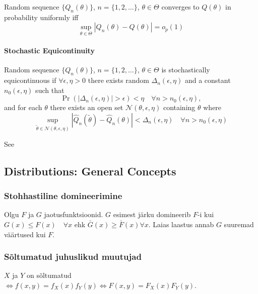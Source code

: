 \documentclass[a4paper]{article}
\numberwithin{equation}{subsection}
\begin{document}
Random sequence $\{Q_{n}(\theta)\}$, $n = \{1,2,\dots\}$, $\theta\in\Theta$ converges to
$Q(\theta)$ in probability uniformly iff
\begin{equation}
  \label{eq:uniform_convergence_in_probability}
  \sup_{\theta\in\Theta}
  \left| Q_{n}(\theta) - Q(\theta) \right| = o_{p}(1)
\end{equation}

\paragraph{Stochastic Equicontinuity}

Random sequence $\{Q_{n}(\theta)\}$, $n = \{1,2,\dots\}$,
$\theta\in\Theta$ is stochastically equicontinuous if $\forall
\epsilon, \eta > 0$ there exists random $\Delta_{n}(\epsilon, \eta)$
and a constant $n_{0}(\epsilon,\eta)$ such that 
\begin{equation}
  \Pr(|\Delta_{n}(\epsilon,\eta)| > \epsilon) < \eta
  \quad \forall n > n_{0}(\epsilon,\eta),
\end{equation}
and for each $\theta$ there exists an open set $\mathscr{N}(\theta,
\epsilon, \eta)$ containing $\theta$ where
\begin{equation}
  \label{eq:stochastic_equicontinuity}
  \sup_{\tilde\theta \in \mathscr{N}(\theta,\epsilon,\eta)}
  \left|
    \hat Q_{n}(\tilde \theta)
    -
    \hat Q_{n}(\theta)
  \right|
  < \Delta_{n}(\epsilon,\eta)
  \quad
  \forall n > n_{0}(\epsilon,\eta)
\end{equation}

See \citet{newey1991Econometrica}


\subsection{Distributions: General Concepts}



\label{sec:jaotused_mqisted}

\subsubsection{Stohhastiline domineerimine}
Olgu $F$ ja $G$ jaotusfunktsioonid.  $G$ esimest järku domineerib
$F$-i kui $G(x) \le F(x) \quad \forall x$ ehk $\bar G(x) \ge \bar F(x)
\forall x$.  Laias laastus annab $G$ suuremad väärtused kui $F$.

\subsubsection{Sõltumatud juhuslikud muutujad}
$X$ ja $Y$ on sõltumatud $\Leftrightarrow f(x,y) = f_X(x) f_Y(y)
\Leftrightarrow F(x,y) = F_X(x) F_Y(y)$.
\end{document}
